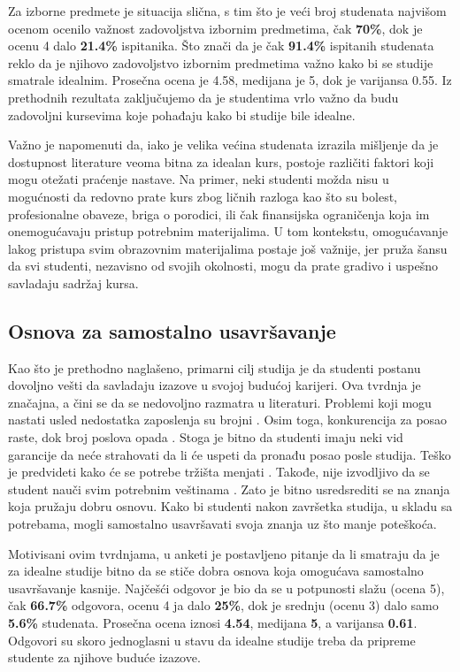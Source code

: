 \documentclass[a4paper]{article}
\begin{document}
{Za izborne predmete je situacija slična, s tim što je veći broj studenata najvišom ocenom ocenilo važnost zadovoljstva izbornim predmetima, čak \textbf{70\%}, dok je ocenu 4 dalo \textbf{21.4\%} ispitanika. Što znači da je čak \textbf{91.4\%} ispitanih studenata reklo da je njihovo zadovoljstvo izbornim predmetima važno kako bi se studije smatrale idealnim. Prosečna ocena je 4.58, medijana je 5, dok je varijansa 0.55. Iz prethodnih rezultata zaključujemo da je studentima vrlo važno da budu zadovoljni kursevima koje pohađaju kako bi studije bile idealne.

Važno je napomenuti da, iako je velika većina studenata izrazila mišljenje da je dostupnost literature veoma bitna za idealan kurs, postoje različiti faktori koji mogu otežati praćenje nastave. Na primer, neki studenti možda nisu u mogućnosti da redovno prate kurs zbog ličnih razloga kao što su bolest, profesionalne obaveze, briga o porodici, ili čak finansijska ograničenja koja im onemogućavaju pristup potrebnim materijalima. U tom kontekstu, omogućavanje lakog pristupa svim obrazovnim materijalima postaje još važnije, jer pruža šansu da svi studenti, nezavisno od svojih okolnosti, mogu da prate gradivo i uspešno savladaju sadržaj kursa.


\subsection{Osnova za samostalno usavršavanje}
\label{subsec:usavršavanje_stavovi}
Kao što je prethodno naglašeno, primarni cilj studija je da studenti postanu dovoljno vešti da savladaju izazove u svojoj budućoj karijeri. Ova tvrdnja je značajna, a čini se da se nedovoljno razmatra u literaturi. Problemi koji mogu nastati usled nedostatka zaposlenja su brojni \cite{job_lacking}. Osim toga, konkurencija za posao raste, dok broj poslova opada \cite{job_competition}. Stoga je bitno da studenti imaju neki vid garancije da neće strahovati da li će uspeti da pronađu posao posle studija.
Teško je predvideti kako će se potrebe tržišta menjati \cite{job_prediction}. Takođe, nije izvodljivo da se student nauči svim potrebnim veštinama \cite{learn_everything}. Zato je bitno usredsrediti se na znanja koja pružaju dobru osnovu. Kako bi studenti nakon završetka studija, u skladu sa potrebama, mogli samostalno usavršavati svoja znanja uz što manje poteškoća.

Motivisani ovim tvrdnjama, u anketi je postavljeno pitanje da li smatraju da je za idealne studije bitno da se stiče dobra osnova koja omogućava samostalno usavršavanje kasnije. Najčešći odgovor je bio da se u potpunosti slažu (ocena 5), čak \textbf{66.7\%} odgovora, ocenu 4 ja dalo \textbf{25\%}, dok je srednju (ocenu 3) dalo samo \textbf{5.6\%} studenata. Prosečna ocena iznosi \textbf{4.54}, medijana \textbf{5}, a varijansa \textbf{0.61}. Odgovori su skoro jednoglasni u stavu da idealne studije treba da pripreme studente za njihove buduće izazove. 

}
\end{document}
